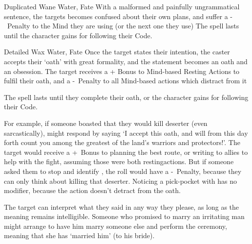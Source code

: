 \ifodd\value{diceNo}

  {Duplicated}%
  {Wane}%
  {Water, Fate}%
  {}%
  {With a malformed and painfully ungrammatical sentence, the targets becomes confused about their own plans, and suffer a -~Penalty to the Mind  they are using (or the next one they use)}%
  {The spell lasts until the character gains  for following their Code.}

\else

  {Detailed}%
  {Wax}%
  {Water, Fate}%
  {}%
  {Once the target states their intention, the caster accepts their `oath' with great formality, and the statement becomes an oath and an obsession.
  The target receives a + Bonus to Mind-based Resting Actions to fulfil their oath, and a -~Penalty to all Mind-based actions which distract from it}%
  {The spell lasts until they complete their oath, or the character gains  for following their Code.

  For example, if someone boasted that they would kill  deserter (even sarcastically),  might respond by saying `I accept this oath, and will from this day forth count you among the greatest of the land's warriors and protectors!'.
  The target would receive a +~Bonus to planning the best route, or writing to allies to help with the fight, assuming those were both \glspl{restingaction}.
  But if someone asked them to stop and identify , the roll would have a -~Penalty, because they can only think about killing that deserter.
  Noticing a pick-pocket with  has no modifier, because the \gls{action} doesn't detract from the oath.

  The target can interpret what they said in any way they please, as long as the meaning remains intelligible.
  Someone who promised to marry an irritating man might arrange to have him marry someone else and perform the ceremony, meaning that she has `married him' (to his bride).}

\fi
{}
